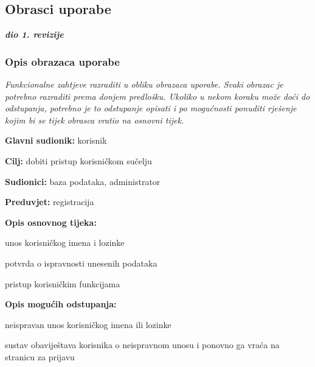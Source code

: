 \eject 



\subsection{Obrasci uporabe}

\textbf{\textit{dio 1. revizije}}

\subsubsection{Opis obrazaca uporabe}
\textit{Funkcionalne zahtjeve razraditi u obliku obrazaca uporabe. Svaki obrazac je potrebno razraditi prema donjem predlošku. Ukoliko u nekom koraku može doći do odstupanja, potrebno je to odstupanje opisati i po mogućnosti ponuditi rješenje kojim bi se tijek obrasca vratio na osnovni tijek.}\\


\noindent {}
\begin{packed_item}
	\item \textbf{Glavni sudionik: }korisnik
	\item  \textbf{Cilj:} dobiti pristup korisničkom sučelju
	\item  \textbf{Sudionici:} baza podataka, administrator
	\item  \textbf{Preduvjet:} registracija
	\item  \textbf{Opis osnovnog tijeka:}
	
	\item[] \begin{packed_enum}
		
		\item unos korisničkog imena i lozinke
		\item potvrda o ispravnosti unesenih podataka
		\item pristup korisničkim funkcijama
	\end{packed_enum}
	
	\item  \textbf{Opis mogućih odstupanja:}
	
	\item[] \begin{packed_item}
		
		\item[1.a] neispravan unos korisničkog imena ili lozinke
		\item[] \begin{packed_enum}
			
			\item sustav obaviještava korisnika o neispravnom unosu i ponovno ga vraća na stranicu za prijavu
			
		\end{packed_enum}
	\end{packed_item}
\end{packed_item}

